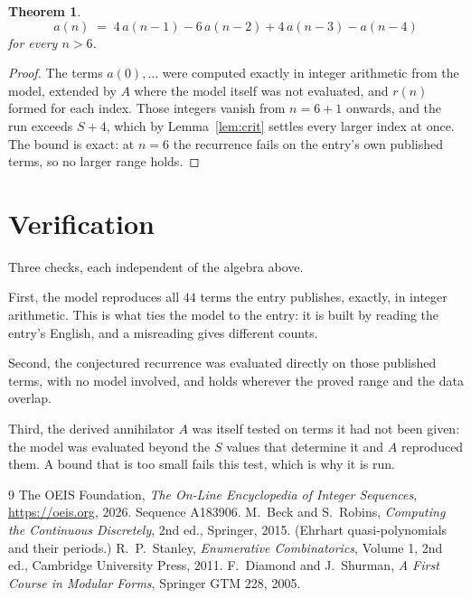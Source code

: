 \documentclass[11pt,a4paper]{article}
\theoremstyle{plain}
\newtheorem{theorem}{Theorem}
\theoremstyle{definition}
\begin{document}
\begin{theorem}
\[
a(n)\;=\;4\,a(n-1) - 6\,a(n-2) + 4\,a(n-3) - a(n-4)
\]
for every $n>6$.
\end{theorem}

\begin{proof}
The terms $a(0),\dots$ were computed exactly in integer arithmetic from the model, extended by
$A$ where the model itself was not evaluated, and $r(n)$ formed for each index. Those integers
vanish from $n=6+1$ onwards, and the run exceeds $S+4$, which by
Lemma~\ref{lem:crit} settles every larger index at once. The bound is exact: at $n=6$ the recurrence fails on the entry's own published terms, so no larger range holds.
\end{proof}

\section{Verification}

Three checks, each independent of the algebra above.

First, the model reproduces all $44$ terms the entry publishes, exactly, in integer
arithmetic. This is what ties the model to the entry: it is built by reading the entry's
English, and a misreading gives different counts.

Second, the conjectured recurrence was evaluated directly on those published terms, with no
model involved, and holds wherever the proved range and the data overlap.

Third, the derived annihilator $A$ was itself tested on terms it had not been given: the model
was evaluated beyond the $S$ values that determine it and $A$ reproduced them. A bound that is
too small fails this test, which is why it is run.

\begin{thebibliography}{9}
 The OEIS Foundation, \emph{The On-Line Encyclopedia of Integer
Sequences}, \url{https://oeis.org}, 2026. Sequence A183906.
 M.~Beck and S.~Robins, \emph{Computing the Continuous Discretely},
2nd ed., Springer, 2015. (Ehrhart quasi-polynomials and their periods.)
 R.~P.~Stanley, \emph{Enumerative Combinatorics}, Volume 1, 2nd ed.,
Cambridge University Press, 2011.
 F.~Diamond and J.~Shurman, \emph{A First Course in Modular Forms},
Springer GTM 228, 2005.
\end{thebibliography}
\end{document}
